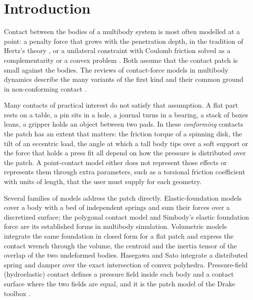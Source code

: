 \section{Introduction}\label{sec:introduction}

Contact between the bodies of a multibody system is most often modelled at a point: a penalty
force that grows with the penetration depth, in the tradition of Hertz's theory
\cite{Hertz1882,HuntCrossley1975}, or a unilateral constraint with Coulomb friction
solved as a complementarity or a convex problem \cite{Stewart1996,Anitescu1997,Todorov2014}. Both
assume that the contact patch is small against the bodies. The reviews of contact-force models in
multibody dynamics describe the many variants of the first kind and their common ground in
non-conforming contact \cite{Machado2012,Skrinjar2018,Corral2021,Flores2022}.

Many contacts of practical interest do not satisfy that assumption. A flat part rests on a table,
a pin sits in a hole, a journal turns in a bearing, a stack of boxes leans, a gripper holds an
object between two pads. In these \emph{conforming} contacts the patch has an extent that
matters: the friction torque of a spinning disk, the tilt of an eccentric load, the angle at
which a tall body tips over a soft support or the force that holds a press fit all depend on how
the pressure is distributed over the patch. A point-contact model either does not represent
those effects or represents them through extra parameters, such as a torsional friction
coefficient with units of length, that the user must supply for each geometry.

Several families of models address the patch directly. Elastic-foundation models cover a body
with a bed of independent springs \cite{Johnson1985} and sum their forces over a discretized
surface; the polygonal contact model \cite{Hippmann2004} and Simbody's elastic foundation force
\cite{Sherman2011} are its established forms in multibody simulation. Volumetric models
\cite{Gonthier2005,Gonthier2007thesis} integrate the same foundation in closed form for a flat
patch and express the contact wrench through the volume, the centroid and the inertia tensor of
the overlap of the two undeformed bodies. Hasegawa and Sato \cite{Hasegawa2004} integrate a
distributed spring and damper over the exact intersection of convex polyhedra. Pressure-field
(hydroelastic) contact \cite{Elandt2019,Masterjohn2022} defines a pressure field inside each
body and a contact surface where the two fields are equal, and it is the patch model of the
Drake toolbox \cite{Drake}.

